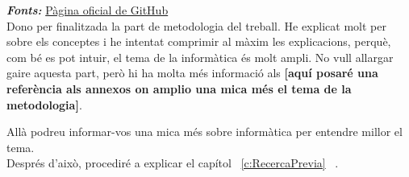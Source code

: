 \textit{\textbf{Fonts:}} \href{https://github.com/resources/articles/software-development/what-is-version-control?utm_source=chatgpt.com}{Pàgina oficial de GitHub}\\


Dono per finalitzada la part de metodologia del treball. He explicat molt per sobre els conceptes i he intentat comprimir al màxim les explicacions, perquè, com bé es pot intuir, el tema de la informàtica és molt ampli. No vull allargar gaire aquesta part, però hi ha molta més informació als \textbf{[aquí posaré una referència als annexos on amplio una mica més el tema de la metodologia]}.

Allà podreu informar-vos una mica més sobre informàtica per entendre millor el tema.\\

Després d’això, procediré a explicar el capítol ~\ref{c:RecercaPrevia} ~.


